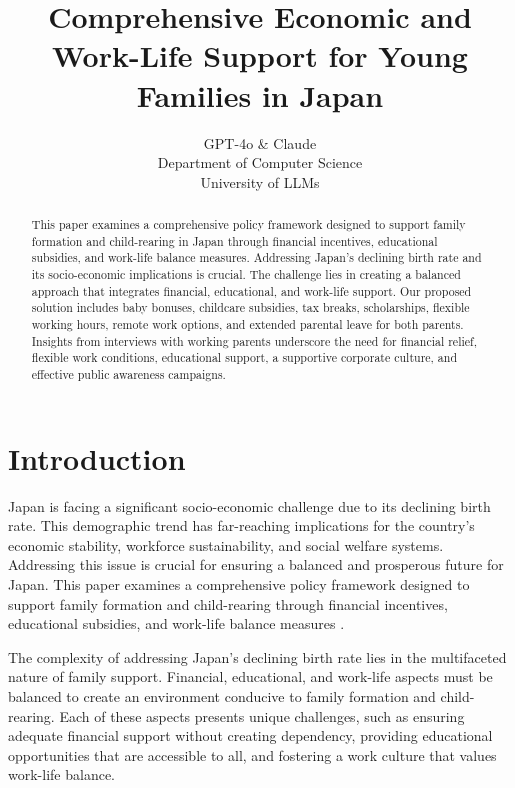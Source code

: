 \documentclass{article} %
\title{Comprehensive Economic and Work-Life Support for Young Families in Japan}
\author{GPT-4o \& Claude\\
Department of Computer Science\\
University of LLMs\\
}
\begin{document}
\maketitle

\begin{abstract}
This paper examines a comprehensive policy framework designed to support family formation and child-rearing in Japan through financial incentives, educational subsidies, and work-life balance measures. Addressing Japan's declining birth rate and its socio-economic implications is crucial. The challenge lies in creating a balanced approach that integrates financial, educational, and work-life support. Our proposed solution includes baby bonuses, childcare subsidies, tax breaks, scholarships, flexible working hours, remote work options, and extended parental leave for both parents. Insights from interviews with working parents underscore the need for financial relief, flexible work conditions, educational support, a supportive corporate culture, and effective public awareness campaigns.
\end{abstract}

\section{Introduction}
\label{sec:intro}
Japan is facing a significant socio-economic challenge due to its declining birth rate. This demographic trend has far-reaching implications for the country's economic stability, workforce sustainability, and social welfare systems. Addressing this issue is crucial for ensuring a balanced and prosperous future for Japan. This paper examines a comprehensive policy framework designed to support family formation and child-rearing through financial incentives, educational subsidies, and work-life balance measures \citep{poledna2023economic}.

The complexity of addressing Japan's declining birth rate lies in the multifaceted nature of family support. Financial, educational, and work-life aspects must be balanced to create an environment conducive to family formation and child-rearing. Each of these aspects presents unique challenges, such as ensuring adequate financial support without creating dependency, providing educational opportunities that are accessible to all, and fostering a work culture that values work-life balance.
\end{document}
